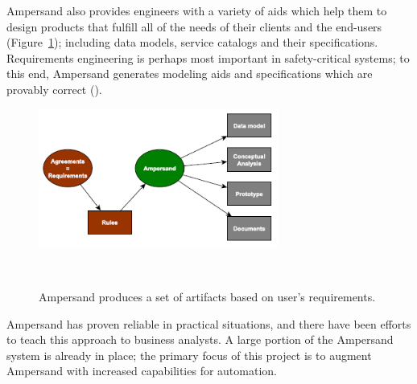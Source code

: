 \documentclass[12pt]{report}
\begin{document}
Ampersand also provides engineers with a variety of aids which
help them to design products that fulfill all of the needs of their clients and
the end-users (Figure~\ref{fig:figure1}); including data models, service catalogs and their
specifications. Requirements engineering is perhaps most important in
safety-critical systems; to this end, Ampersand generates modeling aids and
specifications which are provably correct (\cite{derFun}). 

\begin{figure}
  \centering
    \includegraphics[width=0.7\textwidth]{../figures/ampersand_artifacts}
\caption{Ampersand produces a set of artifacts based on user's requirements.}~\label{fig:figure1}
\end{figure}

Ampersand has proven reliable in practical situations, and there have been
efforts to teach this approach to business analysts. A large portion of the
Ampersand system is already in place; the primary focus of this project is to
augment Ampersand with increased capabilities for automation.
\end{document}
